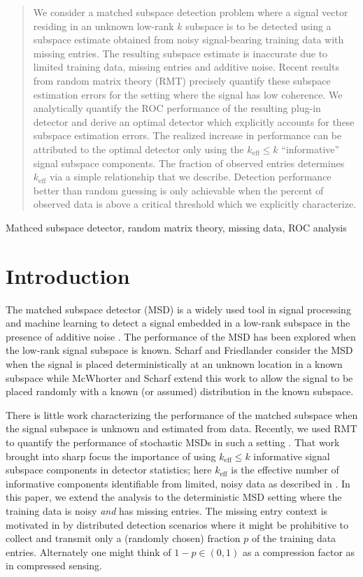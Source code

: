 \begin{abstract}
We consider a matched subspace detection problem where a signal vector residing in an unknown low-rank $k$ subspace is to be detected using a subspace estimate obtained from noisy signal-bearing training data with missing entries. The resulting subspace estimate is inaccurate due to limited training data, missing entries and additive noise. Recent results from random matrix theory (RMT) precisely quantify these subspace estimation errors for the setting where the signal has low coherence. We analytically quantify the ROC performance of the resulting plug-in detector and derive an optimal detector which explicitly accounts for these subspace estimation errors. The realized increase in performance can be attributed to the optimal detector only using the $k_\text{eff}\leq k$ ``informative'' signal subspace components. The fraction of observed entries determines $k_\text{eff}$ via a simple relationship that we describe. Detection performance better than random guessing is only achievable when the percent of observed data is above a critical threshold which we explicitly characterize.
\end{abstract}
%
\begin{keywords}
Mathced subspace detector, random matrix theory, missing data, ROC analysis
\end{keywords}
%
\section{Introduction}\label{sec:intro}

The matched subspace detector (MSD) is a widely used tool in signal processing and machine learning to detect a signal embedded in a low-rank subspace in the presence of additive noise \cite{scharf1994matched,jin2005cfar,mcwhorter2003matched}. The performance of the MSD has been explored when the low-rank signal subspace is known. Scharf and Friedlander \cite{scharf1994matched} consider the MSD when the signal is placed deterministically at an unknown location in a known subspace while McWhorter and Scharf \cite{mcwhorter2003matched} extend this work to allow the signal to be placed randomly with a known (or assumed) distribution in the known subspace.

There is little work characterizing the performance of the matched subspace when the signal subspace is unknown and estimated from data. Recently, we used RMT to quantify the performance of stochastic MSDs in such a setting  \cite{asendorf2011msd}. That work brought into sharp focus the importance of using $k_\text{eff}\leq k$ informative signal subspace components in detector statistics; here $k_{\text{eff}}$ is the effective number of informative components identifiable from limited, noisy data as described in \cite{nadakuditi2008sample}. In this paper, we extend the analysis to the deterministic MSD setting where the training data is noisy \textit{and} has missing entries. The missing entry context is motivated in \cite{balzano2010high} by distributed detection scenarios where it might be prohibitive to collect and transmit only a (randomly chosen) fraction $p$ of the training data entries. Alternately one might think of $1-p \in (0,1)$ as a compression factor as in compressed sensing.

